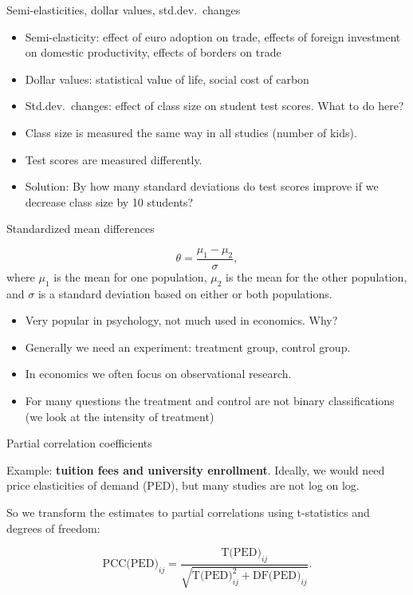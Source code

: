 \documentclass{beamer} %
\begin{document}
\begin{frame}{Semi-elasticities, dollar values, std.dev.\ changes}
\begin{itemize}
	\item Semi-elasticity: effect of euro adoption on trade, effects of foreign investment on domestic productivity, effects of borders on trade
	\item Dollar values: statistical value of life, social cost of carbon
	\item Std.dev.\ changes: effect of class size on student test scores. What to do here?
	\item Class size is measured the same way in all studies (number of kids).
	\item Test scores are measured differently.
	\item Solution: By how many standard deviations do test scores improve if we decrease class size by 10 students?
\end{itemize}
\end{frame}


\begin{frame}{Standardized mean differences}

\[
\theta = \frac{\mu_1 - \mu_2}{\sigma},
\]
where $\mu_1$ is the mean for one population, $\mu_2$ is the mean for the other population, and $\sigma$ is a standard deviation based on either or both populations.

\bigskip
\begin{itemize}
	\item Very popular in psychology, not much used in economics. Why?
	\item Generally we need an experiment: treatment group, control group.
	\item In economics we often focus on observational research.
	\item For many questions the treatment and control are not binary classifications (we look at the intensity of treatment)
\end{itemize}


\end{frame}



\begin{frame}{Partial correlation coefficients}

Example: \textbf{tuition fees and university enrollment}. Ideally, we would need price elasticities of demand (PED), but many studies are not log on log.

\smallskip

 So we transform the estimates to partial correlations using t-statistics and degrees of freedom:

\bigskip

\[
\text{PCC(PED)}_{ij} = \frac{\text{T(PED)}_{ij}}{\sqrt{\text{T(PED)}_{ij}^2 + \text{DF(PED)}_{ij}}}.
\]



\end{frame}
\end{document}
